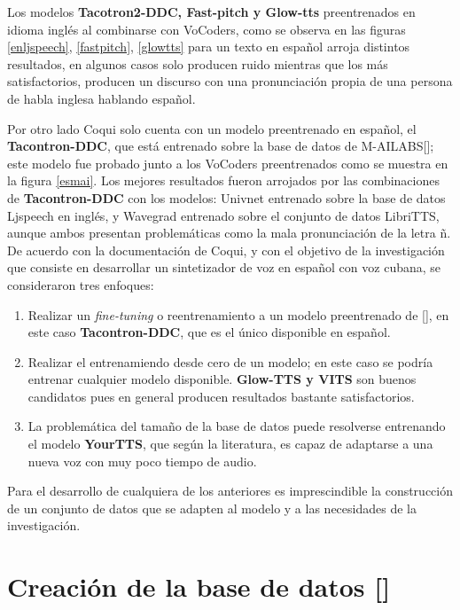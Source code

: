 Los modelos \textbf{Tacotron2-DDC, Fast-pitch y Glow-tts} preentrenados en idioma inglés al combinarse con VoCoders, como se observa en las figuras \ref{enljspeech}, \ref{fastpitch}, \ref{glowtts} para un texto en español arroja distintos resultados, en algunos casos solo producen ruido mientras que los más satisfactorios, producen un discurso con una pronunciación propia de una persona de habla inglesa hablando español.

Por otro lado Coqui solo cuenta con un modelo preentrenado en español, el \textbf{Tacontron-DDC}, que está entrenado sobre la base de datos de M-AILABS[\cite{mailabs}]; este modelo fue probado junto a los VoCoders preentrenados como se muestra en la figura \ref{esmai}. Los mejores resultados fueron arrojados por las combinaciones de \textbf{Tacontron-DDC} con los modelos: Univnet entrenado sobre la base de datos Ljspeech en inglés, y Wavegrad entrenado sobre el conjunto de datos LibriTTS, aunque ambos presentan problemáticas como la mala pronunciación de la letra ñ.\\

De acuerdo con la documentación de Coqui, y con el objetivo de la investigación que consiste en desarrollar un sintetizador de voz en español con voz cubana, se consideraron tres enfoques:

\begin{enumerate}
	\item Realizar un \textit{fine-tuning} o reentrenamiento a un modelo preentrenado de [\cite{coqui-doc}], en este caso \textbf{Tacontron-DDC}, que es el único disponible en español. 
	
	\item Realizar el entrenamiendo desde cero de un modelo; en este caso se podría entrenar cualquier modelo disponible. \textbf{Glow-TTS y VITS} son buenos candidatos pues en general producen resultados bastante satisfactorios.
	
	\item La problemática del tamaño de la base de datos puede resolverse entrenando el modelo \textbf{YourTTS}, que según la literatura, es capaz de adaptarse a una nueva voz con muy poco tiempo de audio.
\end{enumerate}

Para el desarrollo de cualquiera de los anteriores es imprescindible la construcción de un conjunto de datos que se adapten al modelo y a las necesidades de la investigación.


\section{Creación de la base de datos [\cite{formatting-dataset}]}


